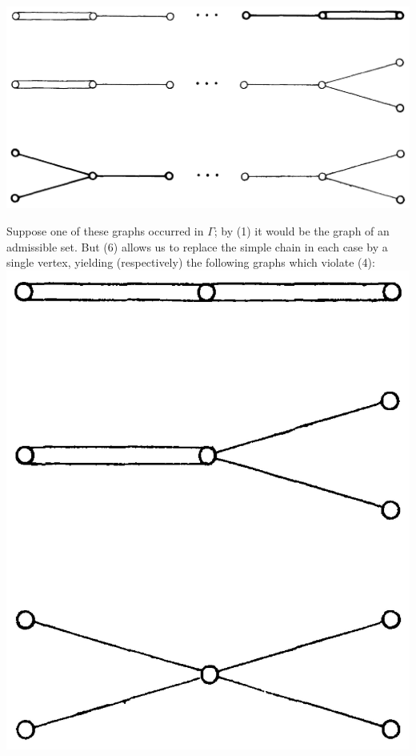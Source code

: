 \documentclass[10pt]{article}
\begin{document}
\includegraphics[max width=\textwidth, center]{2025_06_06_fac2836a92464059da43g-074(1)}

Suppose one of these graphs occurred in $\Gamma$; by (1) it would be the graph of an admissible set. But (6) allows us to replace the simple chain in each case by a single vertex, yielding (respectively) the following graphs which violate (4):\\
\includegraphics[max width=\textwidth, center]{2025_06_06_fac2836a92464059da43g-074}\\
\end{document}
